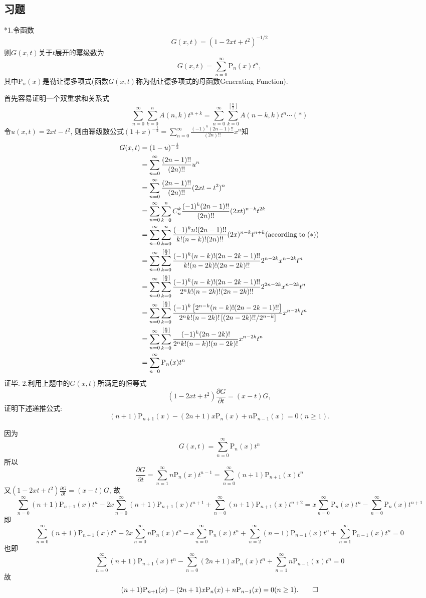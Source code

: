 \documentclass[titlepage,11pt,a4paper,twoside]{report}
\makeatletter
\renewenvironment{proof}{\par
	\pushQED{\qed}%
	\normalfont \topsep1\p@\@plus6\p@\relax
	\trivlist
	\item\relax
	{\hspace*{\parindent}{\heiti 证明}\@addpunct{:}}\hspace\labelsep\ignorespaces
}{%
	\popQED\endtrivlist\@endpefalse
}
\makeatother
\begin{document}
\subsection{习题}
*1.令函数\[G(x,t)=(1-2xt+t^2)^{-1/2}\]
则$G(x,t)$关于$t$展开的幂级数为
\[G(x,t)=\sum_{n=0}^{\infty}\mathrm{P}_n(x)t^n,\]
其中$\mathrm{P}_n(x)$是勒让德多项式(函数$G(x,t)$称为勒让德多项式的母函数Generating Function).
\begin{proof} 
首先容易证明一个双重求和关系式
\[\sum_{n=0}^{\infty}\sum_{k=0}^nA(n,k)t^{n+k}=\sum_{n=0}^{\infty}\sum_{k=0}^{[\frac{n}{2}]}A(n-k,k)t^n\cdots(*)\]
令$u(x,t)=2xt-t^2$, 则由幂级数公式$(1+x)^{-\frac{1}{2}}=\sum_{n=0}^{\infty}\frac{(-1)^n(2n-1)!!}{(2n)!!}x^n$知
\[\begin{split}
G(x,t)&=(1-u)^{-\frac{1}{2}}\\
&=\sum_{n=0}^{\infty}\frac{(2n-1)!!}{(2n)!!}u^n\\
&=\sum_{n=0}^{\infty}\frac{(2n-1)!!}{(2n)!!}(2xt-t^2)^n\\
&=\sum_{n=0}^{\infty}\sum_{k=0}^nC_n^k\frac{(-1)^k(2n-1)!!}{(2n)!!}(2xt)^{n-k}t^{2k}\\
&=\sum_{n=0}^{\infty}\sum_{k=0}^n\frac{(-1)^kn!(2n-1)!!}{k!(n-k)!(2n)!!}(2x)^{n-k}t^{n+k}(\textrm{according\;to}\;(*))\\
&=\sum_{n=0}^{\infty}\sum_{k=0}^{[\frac{n}{2}]}\frac{(-1)^k(n-k)!(2n-2k-1)!!}{k!(n-2k)!(2n-2k)!!}2^{n-2k}x^{n-2k}t^n\\
&=\sum_{n=0}^{\infty}\sum_{k=0}^{[\frac{n}{2}]}\frac{(-1)^k(n-k)!(2n-2k-1)!!}{2^nk!(n-2k)!(2n-2k)!!}2^{2n-2k}x^{n-2k}t^n\\
&=\sum_{n=0}^{\infty}\sum_{k=0}^{[\frac{n}{2}]}\frac{(-1)^k\left[2^{n-k}(n-k)!(2n-2k-1)!!\right]}{2^nk!(n-2k)!\left[(2n-2k)!!/2^{n-k}\right]}x^{n-2k}t^n\\
&=\sum_{n=0}^{\infty}\sum_{k=0}^{[\frac{n}{2}]}\frac{(-1)^k(2n-2k)!}{2^nk!(n-k)!(n-2k)!}x^{n-2k}t^n\\
&=\sum_{n=0}^{\infty}\mathrm{P}_n(x)t^n
\end{split}\]
证毕.
\end{proof}
2.利用上题中的$G(x,t)$所满足的恒等式
\[(1-2xt+t^2)\frac{\partial G}{\partial t}=(x-t)G,\]
证明下述递推公式:\[(n+1)\mathrm{P}_{n+1}(x)-(2n+1)x\mathrm{P}_n(x)+n\mathrm{P}_{n-1}(x)=0(n\geq1).\]
\begin{proof} 因为\[G(x,t)=\sum_{n=0}^{\infty}\mathrm{P}_n(x)t^n\]
所以\[\frac{\partial G}{\partial t}=\sum_{n=1}^{\infty}n\mathrm{P}_n(x)t^{n-1}=\sum_{n=0}^{\infty}(n+1)\mathrm{P}_{n+1}(x)t^n\]
又$(1-2xt+t^2)\frac{\partial G}{\partial t}=(x-t)G$, 故
\[\sum_{n=0}^{\infty}(n+1)\mathrm{P}_{n+1}(x)t^n-2x\sum_{n=0}^{\infty}(n+1)\mathrm{P}_{n+1}(x)t^{n+1}+\sum_{n=0}^{\infty}(n+1)\mathrm{P}_{n+1}(x)t^{n+2}=x\sum_{n=0}^{\infty}\mathrm{P}_n(x)t^n-\sum_{n=0}^{\infty}\mathrm{P}_n(x)t^{n+1}\]
即
\[\sum_{n=0}^{\infty}(n+1)\mathrm{P}_{n+1}(x)t^n-2x\sum_{n=0}^{\infty}n\mathrm{P}_n(x)t^n-x\sum_{n=0}^{\infty}\mathrm{P}_n(x)t^n+\sum_{n=2}^{\infty}(n-1)\mathrm{P}_{n-1}(x)t^n+\sum_{n=1}^{\infty}\mathrm{P}_{n-1}(x)t^n=0\]
也即
\[\sum_{n=0}^{\infty}(n+1)\mathrm{P}_{n+1}(x)t^n-\sum_{n=0}^{\infty}(2n+1)x\mathrm{P}_n(x)t^n+\sum_{n=1}^{\infty}n\mathrm{P}_{n-1}(x)t^n=0\]
故
\[(n+1)\mathrm{P}_{n+1}(x)-(2n+1)x\mathrm{P}_n(x)+n\mathrm{P}_{n-1}(x)=0(n\geq1).\qedhere\]
\end{proof}
\end{document}
